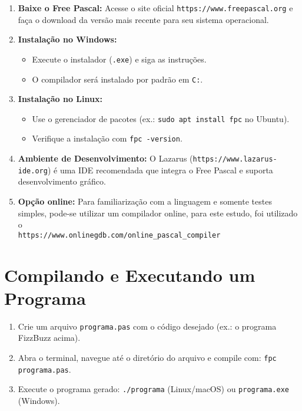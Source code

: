 \documentclass[12pt,a4paper,oneside]{abntex2}
\begin{document}
\begin{enumerate}
    \item \textbf{Baixe o Free Pascal:} Acesse o site oficial \texttt{https://www.freepascal.org} e faça o download da versão mais recente para seu sistema operacional.
    \item \textbf{Instalação no Windows:}
        \begin{itemize}
            \item Execute o instalador (\texttt{.exe}) e siga as instruções.
            \item O compilador será instalado por padrão em \texttt{C:\FPC}.
        \end{itemize}
    \item \textbf{Instalação no Linux:}
        \begin{itemize}
            \item Use o gerenciador de pacotes (ex.: \texttt{sudo apt install fpc} no Ubuntu).
            \item Verifique a instalação com \texttt{fpc -version}.
        \end{itemize}
    \item \textbf{Ambiente de Desenvolvimento:} O Lazarus (\texttt{https://www.lazarus-ide.org}) é uma IDE recomendada que integra o Free Pascal e suporta desenvolvimento gráfico.
    \item \textbf{Opção online:} Para familiarização com a linguagem e somente testes simples, pode-se utilizar um compilador online, para este estudo, foi utilizado o \\\texttt{https://www.onlinegdb.com/online\_pascal\_compiler}
\end{enumerate}

\section{Compilando e Executando um Programa}
\begin{enumerate}
    \item Crie um arquivo \texttt{programa.pas} com o código desejado (ex.: o programa FizzBuzz acima).
    \item Abra o terminal, navegue até o diretório do arquivo e compile com: \texttt{fpc programa.pas}.
    \item Execute o programa gerado: \texttt{./programa} (Linux/macOS) ou \texttt{programa.exe} (Windows).
\end{enumerate}
\end{document}
